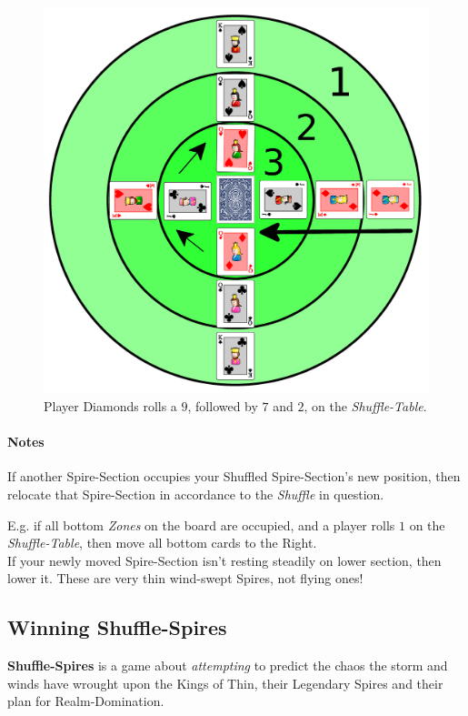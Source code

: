 \documentclass[11pt,twocolumn]{article}
\begin{document}
\begin{figure}[h!]
\centering
\includegraphics[width=\linewidth]{shuffle.png}
\caption{Player Diamonds rolls a $9$, followed by $7$ and $2$, on the \textit{Shuffle-Table}.}
\label{fig:shuffle}
\end{figure}

\paragraph{Notes}
If another Spire-Section occupies your Shuffled Spire-Section's new position, then relocate that Spire-Section in accordance to the \textit{Shuffle} in question.

E.g. if all bottom \textit{Zones} on the board are occupied, and a player rolls $1$ on the \textit{Shuffle-Table}, then move all bottom cards to the Right.\\

\noindent
If your newly moved Spire-Section isn't resting steadily on lower section, then lower it.
These are very thin wind-swept Spires, not flying ones!

\subsection{Winning \textbf{Shuffle-Spires}}
\label{sec:winningshufflespires}
\textbf{Shuffle-Spires} is a game about \textit{attempting} to predict the chaos the storm and winds have wrought upon the Kings of Thin, their Legendary Spires and their plan for Realm-Domination.
\end{document}
